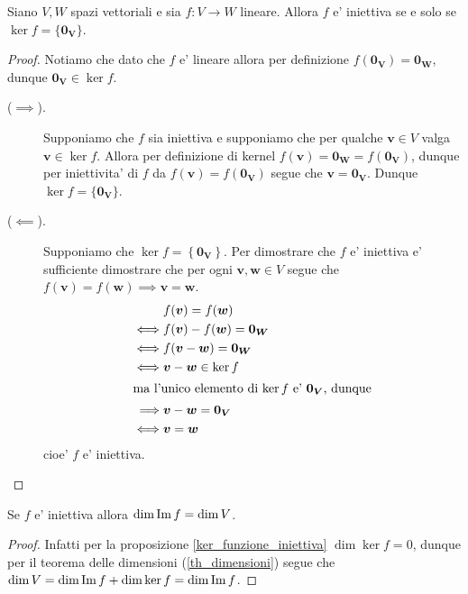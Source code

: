 \begin{proposition}\label{ker_funzione_iniettiva}
    Siano $V, W$ spazi vettoriali e sia $f : V \to W$ lineare. Allora $f$ e' iniettiva se e solo se $\ker f = \{\bm{0_V}\}$. 
\end{proposition}
\begin{proof}
    Notiamo che dato che $f$ e' lineare allora per definizione $f(\bm{0_V}) = \bm{0_W}$, dunque $\bm{0_V} \in \ker f$.
    \begin{description}
        \item [($\implies$).] Supponiamo che $f$ sia iniettiva e supponiamo che per qualche $\bm{v} \in V$ valga $\bm{v} \in \ker f$. Allora per definizione di kernel $f(\bm{v}) = \bm{0_W} = f(\bm{0_V})$, dunque per iniettivita' di $f$ da $f(\bm{v}) = f(\bm{0_V})$ segue che $\bm v = \bm{0_V}$. Dunque $\ker f = \{\bm{0_V}\}$.
        \item [($\impliedby$).] Supponiamo che $\ker f = \left\{ \bm{0_V}\right\}$. Per dimostrare che $f$ e' iniettiva e' sufficiente dimostrare che per ogni $\bm{v}, \bm{w} \in V$ segue che $f(\bm{v}) = f(\bm{w}) \implies \bm{v} = \bm{w}$.
        \begin{alignat*}{1}
            &f(\bm{v}) = f(\bm{w}) \\
            \iff &f(\bm{v}) - f(\bm{w}) = \bm{0_W} \\
            \iff &f(\bm{v} - \bm{w}) = \bm{0_W} \\
            \iff &\bm{v} - \bm{w} \in \ker f \\
            \intertext{ma l'unico elemento di $\ker f$ e' $\bm{0_V}$, dunque}
            \implies &\bm{v} - \bm{w} = \bm{0_V}\\
            \iff &\bm{v} = \bm{w}
        \end{alignat*}
        cioe' $f$ e' iniettiva. \qedhere
    \end{description}
\end{proof}

\begin{corollary}\label{iniettiva_allora_dimIm_uguale_dimV}
    Se $f$ e' iniettiva allora $\dim \operatorname{Im}f = \dim V$.
\end{corollary}
\begin{proof}
    Infatti per la proposizione \ref{ker_funzione_iniettiva} $\dim \ker f = 0$, dunque per il teorema delle dimensioni (\ref{th_dimensioni}) segue che $\dim V = \dim \operatorname{Im}f + \dim \ker f = \dim \operatorname{Im}f$.
\end{proof}

